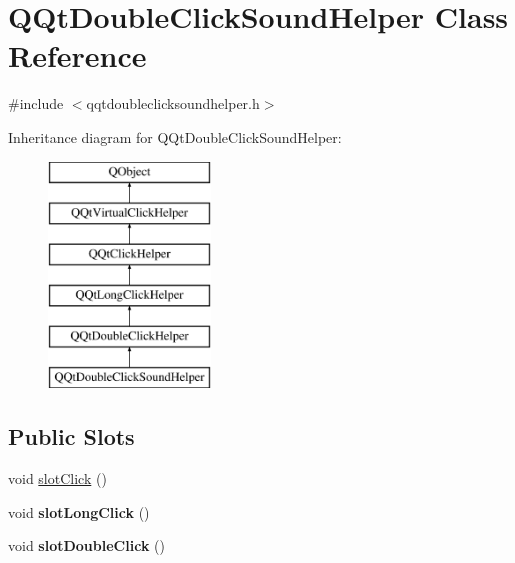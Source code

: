 \hypertarget{class_q_qt_double_click_sound_helper}{}\section{Q\+Qt\+Double\+Click\+Sound\+Helper Class Reference}
\label{class_q_qt_double_click_sound_helper}


{\ttfamily \#include $<$qqtdoubleclicksoundhelper.\+h$>$}

Inheritance diagram for Q\+Qt\+Double\+Click\+Sound\+Helper\+:\begin{figure}[H]
\begin{center}
\leavevmode
\includegraphics[height=6.000000cm]{class_q_qt_double_click_sound_helper}
\end{center}
\end{figure}
\subsection*{Public Slots}
\begin{DoxyCompactItemize}
\item 
void \mbox{\hyperlink{class_q_qt_double_click_sound_helper_abd77662870098b2d026df6f0cad313eb}{slot\+Click}} ()
\item 
\mbox{\label{class_q_qt_double_click_sound_helper_ad9767bae175caf988c81d4719518d9b5}} 
void {\bfseries slot\+Long\+Click} ()
\item 
\mbox{\label{class_q_qt_double_click_sound_helper_a3e291320749dd95ee99a12df58be6be3}} 
void {\bfseries slot\+Double\+Click} ()
\end{DoxyCompactItemize}
